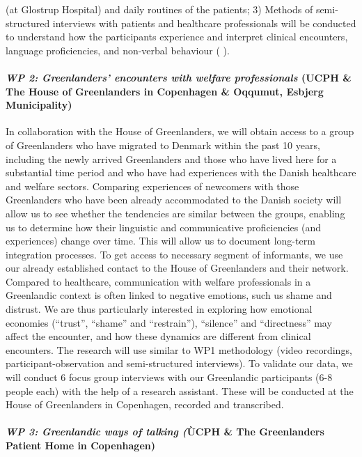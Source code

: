 \documentclass[twocolumn, issue, rga, authordate]{jote-new-article}
\begin{document}
(at Glostrup Hospital) and daily routines of the patients; 3) Methods of semi-structured interviews with patients and healthcare professionals will be conducted to understand how the participants experience and interpret clinical encounters, language proficiencies, and non-verbal behaviour ( \citeyear{Spradley1997}).

  \paragraph{\emph{WP 2: Greenlanders' encounters with welfare professionals} (UCPH \& The House of Greenlanders in Copenhagen \& Oqqumut, Esbjerg Municipality)}

In collaboration with the House of Greenlanders, we will obtain access to a group of Greenlanders who have migrated to Denmark within the past 10 years, including the newly arrived Greenlanders and those who have lived here for a substantial time period and who have had experiences with the Danish healthcare and welfare sectors. Comparing experiences of newcomers with those Greenlanders who have been already accommodated to the Danish society will allow us to see whether the tendencies are similar between the groups, enabling us to determine how their linguistic and communicative proficiencies (and experiences) change over time. This will allow us to document long-term integration processes. To get access to necessary segment of informants, we use our already established contact to the House of Greenlanders and their network.
Compared to healthcare, communication with welfare professionals in a Greenlandic context is often linked to negative emotions, such us shame and distrust. We are thus particularly interested in exploring how emotional economies (``trust'', ``shame'' and ``restrain''), ``silence''
and ``directness'' may affect the encounter, and how these dynamics are different from clinical encounters. The research will use similar to WP1 methodology (video recordings, participant-observation and semi-structured interviews). To validate our data, we will conduct 6 focus group interviews with our Greenlandic participants (6-8 people each) with the help of a research assistant. These will be conducted at the House of Greenlanders in Copenhagen, recorded and transcribed.

\paragraph{\emph{WP 3: Greenlandic ways of talking (}ÙCPH \& The Greenlanders Patient Home in Copenhagen)}
\end{document}
